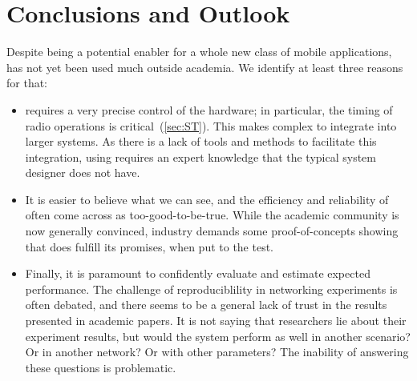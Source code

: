 
\chapter{Conclusions and Outlook}
\label{ch:conclusions}

\squarepar{%
  Cyber-Physical Systems (\CPS) are believed to be the vector of the next computing revolution~\cite{rajkumar2010CPS}. In recent years, the buzz words have changed: it is now all about the ``Internet of Things'' or ``Industry 4.0'' -- different names, same concept.
  We are envisioning a world where devices with computing and wireless communication capabilities are deeply embedded into our lives, in our environments, and even within ourselves.
  However, the current state of technology is not quite yet able to realize these grand visions.
  In this dissertation, we considered certain challenges related to communication in ad-hoc networks; or as we say today: ``on the edge''.
  One important challenge is to support energy efficient and reliable communication within a network of mobile nodes, such as teams of robots or drones.
  It was recently shown that the technique referred to as \emph{synchronous transmissions} (\ST) has a lot of potential to tackle this challenge.
  Indeed, \ST can be leveraged to perform network-wide flooding in a stateless fashion; that is, packets are sent to all nodes in the network, in a way that does not depend on the current topology. And since the topology does not matter, supporting mobility comes essentially for free.%
}


Despite being a potential enabler for a whole new class of mobile \CPS applications, \ST has not yet been used much outside academia. We identify at least three reasons for that:
\begin{itemize}

  \item
  \ST requires a very precise control of the hardware; in particular, the timing of radio operations is critical~(\cref{sec:ST}).
  This makes \ST complex to integrate into larger systems. As there is a lack of tools and methods to facilitate this integration, using \ST requires an expert knowledge that the typical system designer does not have.
  \item
  It is easier to believe what we can see, and the efficiency and reliability of \ST often come across as too-good-to-be-true. While the academic community is now generally convinced, industry demands some proof-of-concepts showing that \ST does fulfill its promises, when put to the test.
  \item
  Finally, it is paramount to confidently evaluate and estimate expected performance.
  The challenge of reproduciblility in networking experiments is often debated, and there seems to be a general lack of trust in the results presented in academic papers.
  It is not saying that researchers lie about their experiment results, but would the system perform as well in another scenario? Or in another network? Or with other parameters?
  The inability of answering these questions  is problematic.

\end{itemize}

